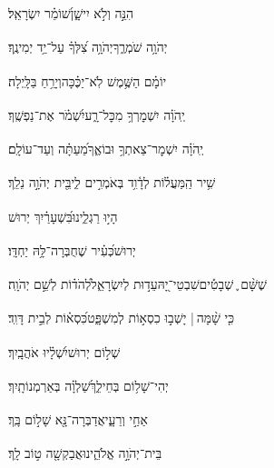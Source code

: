 \documentclass[12pt]{article}
\newcommand{\loc}[1]{\textsuperscript{\locf{#1}}}
\begin{document}
{\loc{ ד}~}‏הִנֵּ֣ה  וְלֹ֣א יִישָׁ֑ן{\hfill}שׁ֝וֹמֵ֗ר יִשְׂרָאֵֽל׃\par

{\loc{ ה}~}‏יְהֹוָ֥ה שֹׁמְרֶ֑ךָ{\hfill}יְהֹוָ֥ה צִ֝לְּךָ֗ עַל־יַ֥ד יְמִינֶֽךָ׃\par

{\loc{ ו}~}‏יוֹמָ֗ם הַשֶּׁ֥מֶשׁ לֹֽא־יַכֶּ֗כָּה{\hfill}וְיָרֵ֥חַ בַּלָּֽיְלָה׃\par

{\loc{ ז}~}‏יְֽהֹוָ֗ה יִשְׁמׇרְךָ֥ מִכׇּל־רָ֑ע{\hfill}יִ֝שְׁמֹ֗ר אֶת־נַפְשֶֽׁךָ׃\par

{\loc{ ח}~}‏יְֽהֹוָ֗ה יִשְׁמׇר־צֵאתְךָ֥ וּבוֹאֶ֑ךָ{\hfill}מֵ֝עַתָּ֗ה וְעַד־עוֹלָֽם׃\par\pend
\ledpb
\pstart[\subsection*{\textcolor{red}{פרק קכב}}]\label{פרק קכב}
{\loc{ א}~}‏שִׁ֥יר הַֽמַּעֲל֗וֹת לְדָ֫וִ֥ד\newline\hspace*{.5em} בְּאֹמְרִ֣ים לִ֑י{\hfill}בֵּ֖ית יְהֹוָ֣ה נֵלֵֽךְ׃\par

{\loc{ ב}~}‏ הָי֣וּ רַגְלֵ֑ינוּ{\hfill}בִּ֝שְׁעָרַ֗יִךְ יְרוּשׁ\par

{\loc{ ג}~}‏יְרוּשׁ{\hfill}כְּ֝עִ֗יר שֶׁחֻבְּרָה־לָּ֥הּ יַחְדָּֽו׃\par

{\loc{ ד}~}‏שֶׁשָּׁ֨ם ֪ שְׁבָטִ֡ים{\hfill}שִׁבְטֵי־יָ֭הּ\newline\hspace*{.5em}עֵד֣וּת לְיִשְׂרָאֵ֑ל{\hfill}לְ֝הֹד֗וֹת לְשֵׁ֣ם יְהֹוָֽה׃\par

{\loc{ ה}~}‏כִּ֤י שָׁ֨מָּה |  יָשְׁב֣וּ כִסְא֣וֹת לְמִשְׁפָּ֑ט{\hfill}כִּ֝סְא֗וֹת לְבֵ֣ית דָּוִֽד׃\par

{\loc{ ו}~}‏ שְׁל֣וֹם יְרוּשׁ{\hfill}יִ֝שְׁלָ֗יוּ אֹהֲבָֽיִךְ׃\par

{\loc{ ז}~}‏יְהִי־שָׁל֥וֹם בְּחֵילֵ֑ךְ{\hfill}שַׁ֝לְוָ֗ה בְּאַרְמְנוֹתָֽיִךְ׃\par

{\loc{ ח}~}‏ אַחַ֣י וְרֵעָ֑י{\hfill}אֲדַבְּרָה־נָּ֖א שָׁל֣וֹם בָּֽךְ׃\par

{\loc{ ט}~}‏ בֵּית־יְהֹוָ֣ה אֱלֹהֵ֑ינוּ{\hfill}אֲבַקְשָׁ֖ה ט֣וֹב לָֽךְ׃\par\pend
\end{document}
